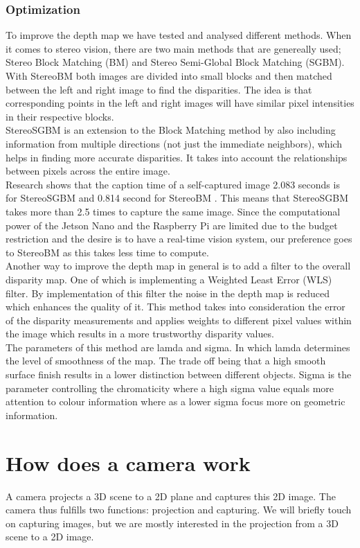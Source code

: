 \documentclass{article}[a4paper]
\begin{document}
\subsubsection{Optimization}
To improve the depth map we have tested and analysed different methods. When it comes to stereo vision, there are two main methods that are genereally used; Stereo Block Matching (BM) and Stereo Semi-Global Block Matching (SGBM). 
\\ With StereoBM both images are divided into small blocks and then matched between the left and right image to find the disparities. The idea is that corresponding points in the left and right images will have similar pixel intensities in their respective blocks.
\\ StereoSGBM is an extension to the Block Matching method by also including information from multiple directions (not just the immediate neighbors), which helps in finding more accurate disparities. It takes into account the relationships between pixels across the entire image. 
\\ Research shows that the caption time of a self-captured image 2.083 seconds is for StereoSGBM and 0.814 second for StereoBM \cite{Verma_Verma_2018}. This means that StereoSGBM takes more than 2.5 times to capture the same image. Since the computational power of the Jetson Nano and the Raspberry Pi are limited due to the budget restriction and the desire is to have a real-time vision system, our preference goes to StereoBM as this takes less time to compute. 
\bigskip
\\ Another way to improve the depth map in general is to add a filter to the overall disparity map. One of which is implementing a Weighted Least Error (WLS) filter. By implementation of this filter the noise in the depth map is reduced which enhances the quality of it. This method takes into consideration the error of the disparity measurements and applies weights to different pixel values within the image which results in a more trustworthy disparity values.
\\ The parameters of this method are lamda and sigma. In which lamda determines the level of smoothness of the map. The trade off being that a high smooth surface finish results in a lower distinction between different objects. Sigma is the parameter controlling the chromaticity where a high sigma value equals more attention to colour information where as a lower sigma focus more on geometric information.  
\newpage

\appendix
\section{How does a camera work}
A camera projects a 3D scene to a 2D plane and captures this 2D image.
The camera thus fulfills two functions: projection and capturing. 
We will briefly touch on capturing images, but we are mostly interested in the projection from a 3D scene to a 2D image.
\end{document}
